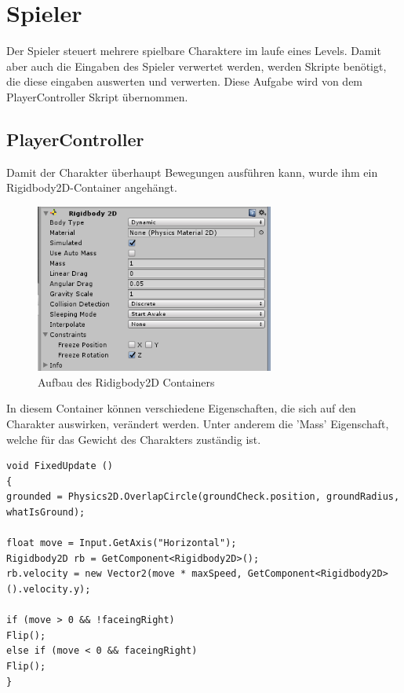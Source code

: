 \section{Spieler}
Der Spieler steuert mehrere spielbare Charaktere im laufe  eines Levels. Damit aber auch die Eingaben des Spieler verwertet werden, werden Skripte benötigt, die diese eingaben auswerten und verwerten. Diese Aufgabe wird von dem PlayerController Skript übernommen. 
\subsection{PlayerController}
Damit der Charakter überhaupt Bewegungen ausführen kann, wurde ihm ein Rigidbody2D-Container angehängt.
\begin{figure}[htbp] 
	\centering
	\includegraphics[width=0.7\textwidth]{images/Ridigbody2D.png}
	\caption{Aufbau des Ridigbody2D Containers}
\end{figure}
In diesem Container können verschiedene Eigenschaften, die sich auf den Charakter auswirken, verändert werden. Unter anderem die 'Mass' Eigenschaft, welche für das Gewicht des Charakters zuständig ist.


\begin{lstlisting}[language={[Sharp]C}, caption=Player-Script]
void FixedUpdate ()
{
grounded = Physics2D.OverlapCircle(groundCheck.position, groundRadius, whatIsGround);

float move = Input.GetAxis("Horizontal");
Rigidbody2D rb = GetComponent<Rigidbody2D>();
rb.velocity = new Vector2(move * maxSpeed, GetComponent<Rigidbody2D>().velocity.y);

if (move > 0 && !faceingRight)
Flip();
else if (move < 0 && faceingRight)
Flip();
}
\end{lstlisting}


